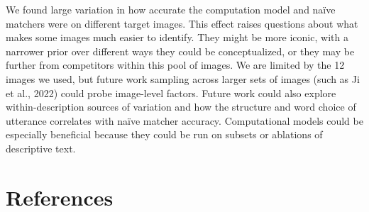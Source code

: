 \documentclass[10pt, letterpaper]{article}
\begin{document}
We found large variation in how accurate the computation model and naïve
matchers were on different target images. This effect raises questions
about what makes some images much easier to identify. They might be more
iconic, with a narrower prior over different ways they could be
conceptualized, or they may be further from competitors within this pool
of images. We are limited by the 12 images we used, but future work
sampling across larger sets of images (such as Ji et al., 2022) could
probe image-level factors. Future work could also explore
within-description sources of variation and how the structure and word
choice of utterance correlates with naïve matcher accuracy.
Computational models could be especially beneficial because they could
be run on subsets or ablations of descriptive text.

\section{References}\label{references}

\setlength{\parindent}{-0.1in} 
\setlength{\leftskip}{0.125in}

\noindent
\end{document}

